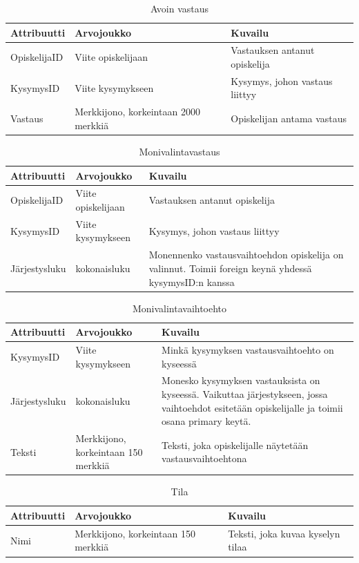 \documentclass[12pt,a4paper,titlepage]{article}
\begin{document}
\begin{table}[h]
\caption{Avoin vastaus}
\begin{tabularx}{\textwidth}{ |  l X X  |}
  \hline
  Attribuutti & Arvojoukko & Kuvailu \\
  \hline
  OpiskelijaID & Viite opiskelijaan & Vastauksen antanut opiskelija \\
  KysymysID & Viite kysymykseen & Kysymys, johon vastaus liittyy \\
  Vastaus & Merkkijono, korkeintaan 2000 merkkiä & Opiskelijan antama vastaus \\
  \hline
\end{tabularx}
\end{table}

\begin{table}[h]
\caption{Monivalintavastaus}
\begin{tabularx}{\textwidth}{ |  l X X  |}
  \hline
  Attribuutti & Arvojoukko & Kuvailu \\
  \hline
  OpiskelijaID & Viite opiskelijaan & Vastauksen antanut opiskelija \\
  KysymysID & Viite kysymykseen & Kysymys, johon vastaus liittyy \\
  Järjestysluku & kokonaisluku & Monennenko vastausvaihtoehdon opiskelija on valinnut. Toimii foreign keynä yhdessä kysymysID:n kanssa \\
  \hline
\end{tabularx}
\end{table}

\begin{table}[h]
\caption{Monivalintavaihtoehto}
\begin{tabularx}{\textwidth}{ |  l X X  |}
  \hline
  Attribuutti & Arvojoukko & Kuvailu \\
  \hline
  KysymysID & Viite kysymykseen & Minkä kysymyksen vastausvaihtoehto on kyseessä \\
  Järjestysluku & kokonaisluku & Monesko kysymyksen vastauksista on kyseessä. Vaikuttaa järjestykseen, jossa vaihtoehdot esitetään opiskelijalle ja toimii osana primary keytä. \\
  Teksti & Merkkijono, korkeintaan 150 merkkiä & Teksti, joka opiskelijalle näytetään vastausvaihtoehtona \\
  \hline
\end{tabularx}
\end{table}

\begin{table}[h]
\caption{Tila} \label{tietokohde_viimeinen}
\begin{tabularx}{\textwidth}{ |  l X X  |}
  \hline
  Attribuutti & Arvojoukko & Kuvailu \\
  \hline
  Nimi & Merkkijono, korkeintaan 150 merkkiä & Teksti, joka kuvaa kyselyn tilaa\\
  \hline
\end{tabularx}
\end{table}
\end{document}
